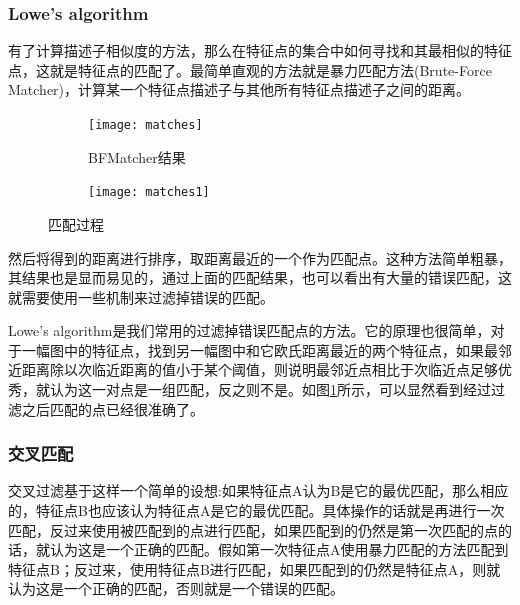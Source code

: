 \subsubsection{Lowe’s algorithm}
有了计算描述子相似度的方法，那么在特征点的集合中如何寻找和其最相似的特征点，这就是特征点的匹配了。最简单直观的方法就是暴力匹配方法(Brute-Force Matcher)，计算某一个特征点描述子与其他所有特征点描述子之间的距离。
\begin{figure}[H]
\centering
\begin{subfigure}[ht]{0.4\textwidth}
	\centering
	\texttt{[image: matches]}
	\caption{BFMatcher结果}
\end{subfigure}
\quad
\begin{subfigure}[ht]{0.4\textwidth}
	\centering
	\texttt{[image: matches1]}
	\label{lowe's filter}
\end{subfigure}
\caption{匹配过程}\label{differentsigma}
\end{figure}
然后将得到的距离进行排序，取距离最近的一个作为匹配点。这种方法简单粗暴，其结果也是显而易见的，通过上面的匹配结果，也可以看出有大量的错误匹配，这就需要使用一些机制来过滤掉错误的匹配。\par
Lowe's algorithm\cite{muja2009fast}是我们常用的过滤掉错误匹配点的方法。它的原理也很简单，对于一幅图中的特征点，找到另一幅图中和它欧氏距离最近的两个特征点，如果最邻近距离除以次临近距离的值小于某个阈值，则说明最邻近点相比于次临近点足够优秀，就认为这一对点是一组匹配，反之则不是。如图\ref{lowe's filter}所示，可以显然看到经过过滤之后匹配的点已经很准确了。
\subsubsection{交叉匹配}
交叉过滤基于这样一个简单的设想:如果特征点A认为B是它的最优匹配，那么相应的，特征点B也应该认为特征点A是它的最优匹配。具体操作的话就是再进行一次匹配，反过来使用被匹配到的点进行匹配，如果匹配到的仍然是第一次匹配的点的话，就认为这是一个正确的匹配。假如第一次特征点A使用暴力匹配的方法匹配到特征点B；反过来，使用特征点B进行匹配，如果匹配到的仍然是特征点A，则就认为这是一个正确的匹配，否则就是一个错误的匹配。














